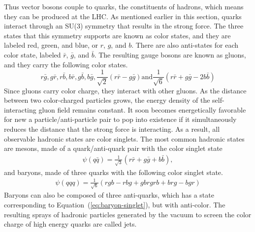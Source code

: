 Thus vector bosons couple to quarks, the constituents of hadrons,
which means they can be produced at the LHC.
As mentioned earlier in this section,
quarks interact through an SU(3) symmetry that results in the strong force.
The three states that this symmetry supports are known as color states,
and they are labeled red, green, and blue, or $r$, $g$, and $b$.
There are also anti-states for each color state,
labeled $\bar{r}$, $\bar{g}$, and $\bar{b}$.
The resulting gauge bosons are known as gluons, and they carry the following color states.
\[
r\bar{g}, g\bar{r}, r\bar{b}, b\bar{r}, g\bar{b}, b\bar{g}, \frac{1}{\sqrt{2}}(r\bar{r} - g\bar{g}) \mathrm{and} \frac{1}{\sqrt{6}}(r\bar{r} + g\bar{g} - 2b\bar{b})
\]
Since gluons carry color charge, they interact with other gluons.
As the distance between two color-charged particles grows,
the energy density of the self-interacting gluon field remains constant.
It soon becomes energetically favorable for new a particle/anti-particle pair
to pop into existence if it simultaneously reduces the distance that the strong force is interacting.
As a result, all observable hadronic states are color singlets.
The most common hadronic states are mesons, made of a quark/anti-quark pair
with the color singlet state
\begin{gather}
  \psi(q\bar{q}) = \frac1{\sqrt{3}} (r\bar{r} + g\bar{g} + b\bar{b}),
\end{gather}
and baryons, made of three quarks with the following color singlet state.
\begin{gather}
  \psi(qqq) = \frac{1}{\sqrt{6}}(rgb - rbg + gbr  grb + brg - bgr) \label{eq:baryon-singlet}
\end{gather}
Baryons can also be composed of three anti-quarks,
which has a state corresponding to Equation~(\ref{eq:baryon-singlet}),
but with anti-color.
The resulting sprays of hadronic particles generated by the vacuum to screen the color charge of high energy quarks
are called jets.

